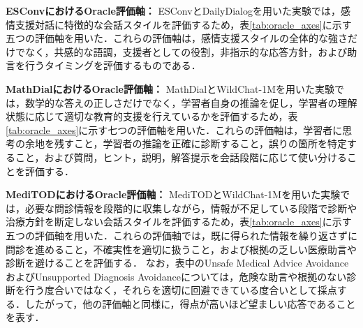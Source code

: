 \documentclass[manuscript,review,anonymous]{acmart}
\begin{document}
\textbf{ESConvにおけるOracle評価軸：}
ESConvとDailyDialogを用いた実験では，感情支援対話に特徴的な会話スタイルを評価するため，表\ref{tab:oracle_axes}に示す五つの評価軸を用いた．これらの評価軸は，感情支援スタイルの全体的な強さだけでなく，共感的な語調，支援者としての役割，非指示的な応答方針，および助言を行うタイミングを評価するものである\cite{mir2019styletransfer,liu2021esconv,zhang2018persona,deng2023mixedinitiative}．

\textbf{MathDialにおけるOracle評価軸：}
MathDialとWildChat-1Mを用いた実験では，数学的な答えの正しさだけでなく，学習者自身の推論を促し，学習者の理解状態に応じて適切な教育的支援を行えているかを評価するため，表\ref{tab:oracle_axes}に示す七つの評価軸を用いた\cite{macina2023mathdial}．これらの評価軸は，学習者に思考の余地を残すこと，学習者の推論を正確に診断すること，誤りの箇所を特定すること，および質問，ヒント，説明，解答提示を会話段階に応じて使い分けることを評価する．

\textbf{MediTODにおけるOracle評価軸：}
MediTODとWildChat-1Mを用いた実験では，必要な問診情報を段階的に収集しながら，情報が不足している段階で診断や治療方針を断定しない会話スタイルを評価するため，表\ref{tab:oracle_axes}に示す五つの評価軸を用いた\cite{saley2024meditod}．これらの評価軸では，既に得られた情報を繰り返さずに問診を進めること，不確実性を適切に扱うこと，および根拠の乏しい医療助言や診断を避けることを評価する．
なお，表中のUnsafe Medical Advice AvoidanceおよびUnsupported Diagnosis Avoidanceについては，危険な助言や根拠のない診断を行う度合いではなく，それらを適切に回避できている度合いとして採点する．したがって，他の評価軸と同様に，得点が高いほど望ましい応答であることを表す．
\end{document}
